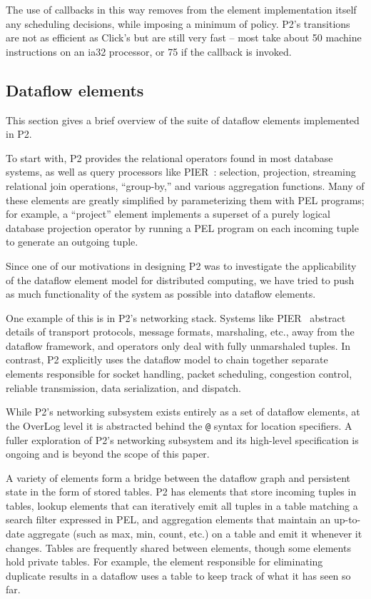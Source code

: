 \documentclass{sig-alt-full}
\def\Sys{P2\xspace}
\def\Lang{OverLog\xspace}
\def\ELang{PEL\xspace}
\def\Elang{\ELang}
\newcommand{\ol}[1]{{\tt\footnotesize#1}}
\begin{document}
The use of callbacks in this way removes from the element
implementation itself any scheduling decisions, while imposing a
minimum of policy.  P2's transitions are not as efficient as Click's
but are still very fast -- most take about 50 machine instructions on
an ia32 processor, or 75 if the callback is invoked. 

\subsection{Dataflow elements}
\label{sec:elements}

This section gives a brief overview of the suite of dataflow elements 
implemented in \Sys.  

To start with, \Sys provides the relational operators
found in most database systems, as well as query processors like
PIER~\cite{pier-cidr}: selection, projection, streaming
relational join
operations, 
``group-by,'' and various aggregation functions.  Many of these
elements are greatly simplified by parameterizing them with \ELang
programs; for example, a ``project'' element implements a superset of
a purely logical database projection operator by running a \ELang program
on each incoming tuple to generate an outgoing tuple. 

Since one of our motivations in designing \Sys was to investigate the
applicability of the dataflow element model for distributed computing,
we have tried to push as much functionality of the system as possible
into dataflow elements.  

One example of this is in \Sys's networking stack.  Systems like
PIER~\cite{pier-cidr} abstract details of transport protocols, message
formats, marshaling, etc., away from the dataflow framework, and
operators only deal with fully unmarshaled tuples.  In contrast, \Sys
explicitly uses the dataflow model to chain together separate elements 
responsible for socket handling, packet scheduling, congestion
control, reliable transmission, data serialization, and dispatch.

While \Sys's networking subsystem exists entirely as a set of
dataflow elements, at the \Lang level it is abstracted behind the
\ol{@} syntax for location specifiers. A fuller
exploration of \Sys's networking subsystem and its high-level
specification is ongoing and is beyond the scope of this
paper.

A variety of elements form a bridge between the dataflow graph and
persistent state in the form of stored tables.  \Sys has elements
that store incoming tuples in tables, lookup elements that can
iteratively emit all tuples in a table matching a search filter
expressed in \Elang, and aggregation elements that 
maintain an up-to-date aggregate (such as max, min, count, etc.) on a
table and emit it whenever it changes.  Tables are frequently shared
between elements, though some elements hold private tables.   For
example, the element responsible for eliminating duplicate results in a
dataflow uses a table to keep track of what it has seen so far.
\end{document}
